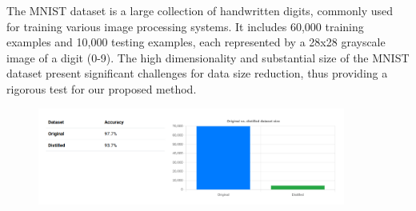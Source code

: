 The MNIST dataset is a large collection of handwritten digits, commonly used for training various image processing systems. It includes 60,000 training examples and 10,000 testing examples, each represented by a 28x28 grayscale image of a digit (0-9). The high dimensionality and substantial size of the MNIST dataset present significant challenges for data size reduction, thus providing a rigorous test for our proposed method.

\begin{figure}[h]
\includegraphics[width=0.9\textwidth]{images/MNIST_validation_test.png}
\centering
\caption{}
\end{figure}